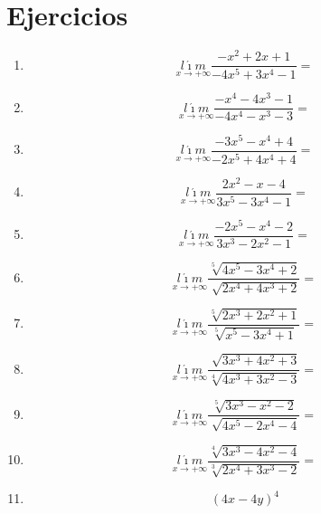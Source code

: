 \documentclass[oneside,spanish,letter]{article}
\begin{document}
\section{Ejercicios}
\begin{enumerate}
 \item $$\underset{x\rightarrow +\infty}{l\acute{\imath}m} \frac{-x^2+2x+1}{-4x^5+3x^4-1}=$$
 \item $$\underset{x\rightarrow +\infty}{l\acute{\imath}m} \frac{-x^4-4x^3-1}{-4x^4-x^3-3}=$$
 \item $$\underset{x\rightarrow +\infty}{l\acute{\imath}m} \frac{-3x^5-x^4+4}{-2x^5+4x^4+4}=$$
 \item $$\underset{x\rightarrow +\infty}{l\acute{\imath}m} \frac{2x^2-x-4}{3x^5-3x^4-1}=$$
 \item $$\underset{x\rightarrow +\infty}{l\acute{\imath}m} \frac{-2x^5-x^4-2}{3x^3-2x^2-1}=$$
 \item $$\underset{x\rightarrow +\infty}{l\acute{\imath}m} \frac{\sqrt[5]{4x^5-3x^4+2}}{\sqrt[]{2x^4+4x^3+2}}=$$
 \item $$\underset{x\rightarrow +\infty}{l\acute{\imath}m} \frac{\sqrt[5]{2x^3+2x^2+1}}{\sqrt[5]{x^5-3x^4+1}}=$$
 \item $$\underset{x\rightarrow +\infty}{l\acute{\imath}m} \frac{\sqrt[]{3x^3+4x^2+3}}{\sqrt[4]{4x^3+3x^2-3}}=$$
 \item $$\underset{x\rightarrow +\infty}{l\acute{\imath}m} \frac{\sqrt[5]{3x^3-x^2-2}}{\sqrt[]{4x^5-2x^4-4}}=$$
 \item $$\underset{x\rightarrow +\infty}{l\acute{\imath}m} \frac{\sqrt[4]{3x^3-4x^2-4}}{\sqrt[3]{2x^4+3x^3-2}}=$$
\item $$(4x-4y)^4$$
 \end{enumerate}
  \newpage
\end{document}

